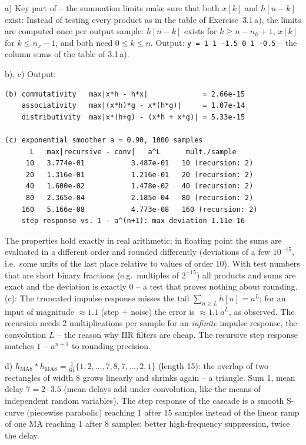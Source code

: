 \begin{solution}
a) Key part of  -- the summation
limits make sure that both $x[k]$ and $h[n-k]$ exist:
Instead of testing every product as in the table of Exercise~3.1\,a), the
limits are computed once per output sample: $h[n-k]$ exists for
$k\ge n-n_h+1$, $x[k]$ for $k\le n_x-1$, and both need $0\le k\le n$.
Output: \texttt{y = 1 1 -1.5 0 1 -0.5} -- the column sums of the table of 3.1\,a).

b), c) Output:
\begin{lstlisting}[style=shell,numbers=none]
(b) commutativity   max|x*h - h*x|             = 2.66e-15
    associativity   max|(x*h)*g - x*(h*g)|     = 1.07e-14
    distributivity  max|x*(h+g) - (x*h + x*g)| = 5.33e-15

(c) exponential smoother a = 0.90, 1000 samples
      L   max|recursive - conv|   a^L      mult./sample
     10   3.774e-01           3.487e-01   10 (recursion: 2)
     20   1.316e-01           1.216e-01   20 (recursion: 2)
     40   1.600e-02           1.478e-02   40 (recursion: 2)
     80   2.365e-04           2.185e-04   80 (recursion: 2)
    160   5.166e-08           4.773e-08   160 (recursion: 2)
    step response vs. 1 - a^(n+1): max deviation 1.11e-16
\end{lstlisting}
The properties hold exactly in real arithmetic; in floating point the sums are
evaluated in a different order and rounded differently (deviations of a few
$10^{-15}$, i.e.\ some units of the last place relative to values of order 10).
With test numbers that are short binary fractions (e.g.\ multiples of $2^{-15}$)
all products and sums are exact and the deviation is exactly 0 -- a test that
proves nothing about rounding. (c): The truncated impulse response misses the
tail $\sum_{n\ge L}h[n]=a^L$; for an input of magnitude $\approx1.1$ (step + noise)
the error is $\approx1.1\,a^L$, as observed. The recursion needs 2
multiplications per sample for an \emph{infinite} impulse response, the
convolution $L$ -- the reason why IIR filters are cheap. The recursive step
response matches $1-a^{n+1}$ to rounding precision.

d) $h_{\text{MA8}}*h_{\text{MA8}}=\frac{1}{64}\{1,2,\dots,7,8,7,\dots,2,1\}$
(length 15): the overlap of two rectangles of width 8 grows linearly and shrinks
again -- a triangle. Sum 1, mean delay $7=2\cdot3.5$ (mean delays add under
convolution, like the means of independent random variables). The step response
of the cascade is a smooth S-curve (piecewise parabolic) reaching 1 after 15
samples instead of the linear ramp of one MA reaching 1 after 8 samples:
better high-frequency suppression, twice the delay.
\end{solution}

